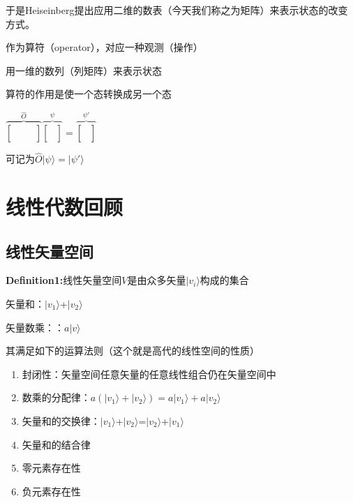 \documentclass[lang=cn,10pt]{elegantbook}
\begin{document}
于是Heiseinberg提出应用二维的数表（今天我们称之为矩阵）来表示状态的改变方式。

作为算符（operator），对应一种观测（操作）

用一维的数列（列矩阵）来表示状态

算符的作用是使一个态转换成另一个态

$\overset{\hat{O}}{\overbrace{\left[ \begin{matrix}
			&		&		\\
			&		&		\\
			&		&		\\
		\end{matrix} \right] }}\overset{\psi}{\overbrace{\left[ \begin{array}{c}
			\\
			\\
			\\
		\end{array} \right] }}=\overset{\psi'}{\overbrace{\left[ \begin{array}{c}
			\\
			\\
			\\
		\end{array} \right] }}$
	
	
可记为$\hat{O}|\psi \rangle =|\psi' \rangle $

\section{线性代数回顾}
\subsection{线性矢量空间}

\textbf{Definition1:}线性矢量空间$V$是由众多矢量$|v_i \rangle $构成的集合

矢量和：$|v_1 \rangle $+$|v_2 \rangle $

矢量数乘：：$a|v \rangle $

其满足如下的运算法则（这个就是高代的线性空间的性质）
\begin{enumerate}
	\item 封闭性：矢量空间任意矢量的任意线性组合仍在矢量空间中
	\item 数乘的分配律：$a(|v_1 \rangle +|v_2 \rangle)=a|v_1 \rangle +a|v_2 \rangle$
	\item 矢量和的交换律：$|v_1 \rangle $+$|v_2 \rangle $=$|v_2 \rangle $+$|v_1 \rangle $
	\item 矢量和的结合律
	\item 零元素存在性
	\item 负元素存在性
\end{enumerate}
\end{document}
